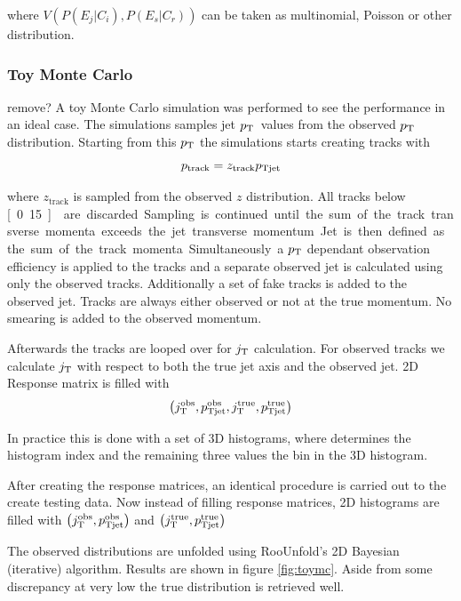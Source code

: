 \noindent where $V\left(P\left(E_j | C_i\right), P\left(E_s | C_r\right) \right)$ can be taken as multinomial, Poisson or other distribution.
 
\subsubsection{Toy Monte Carlo} 
 {\color{red} remove?}
 A toy Monte Carlo simulation was performed to see the performance in an ideal case.
The simulations samples jet $p_{\rm T}$ values from the observed $p_{\rm T}$ distribution. Starting from this $p_{\rm T}$ the simulations starts creating tracks with 
\begin{equation}
p_{\mathrm{track}} = z_\mathrm{track} p_{\rm Tjet}
\end{equation}

\noindent where $z_\mathrm{track} $ is sampled from the observed $z$ distribution. All tracks below \unit[0.15]{\gev} are discarded. Sampling is continued until the sum of the track transverse momenta exceeds the jet transverse momentum. Jet is then defined as the sum of the track momenta.

Simultaneously a $p_{\rm T}$ dependant observation efficiency is applied to the tracks and a separate observed jet is calculated using only the observed tracks. Additionally a set of fake tracks is added to the observed jet. Tracks are always either observed or not at the true momentum. No smearing is added to the observed momentum.

Afterwards the tracks are looped over for $j_{\rm T}$ calculation. For observed tracks we calculate $j_{\rm T}$ with respect to both the true jet axis and the observed jet. 2D Response matrix is filled with \begin{equation}
\left(j_{\rm T}^\mathrm{obs},p_{\rm Tjet}^\mathrm{obs}, j_{\rm T}^\mathrm{true},p_{\rm Tjet}^\mathrm{true}\right)
\end{equation}

In practice this is done with a set of 3D histograms, where  determines the histogram index and the remaining three values the bin in the 3D histogram.

After creating the response matrices, an identical procedure is carried out to the create testing data. Now instead of filling response matrices, 2D histograms are filled with $\left(j_{\rm T}^\mathrm{obs},p_{\rm Tjet}^\mathrm{obs}\right)$ and $\left(j_{\rm T}^\mathrm{true},p_{\rm Tjet}^\mathrm{true}\right)$

The observed distributions are unfolded using RooUnfold's 2D Bayesian (iterative) algorithm. Results are shown in figure \ref{fig:toymc}. Aside from some discrepancy at very low \jt{} the true distribution is retrieved well. 

